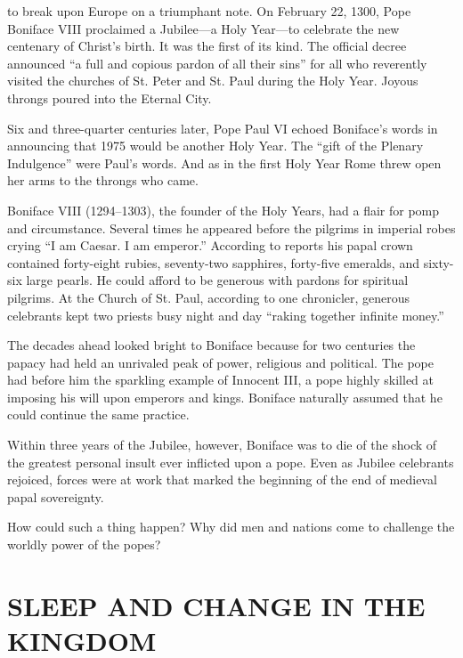 
 to break upon Europe on a triumphant note. On February
22, 1300, Pope Boniface VIII proclaimed a Jubilee—a Holy Year—to celebrate the new centenary of
Christ’s birth. It was the first of its kind. The official decree announced “a full and copious
pardon of all their sins” for all who reverently visited the churches of St. Peter and St. Paul
during the Holy Year. Joyous throngs poured into the Eternal City.

Six and three-quarter centuries later, Pope Paul VI echoed Boniface’s words in announcing that 1975
would be another Holy Year. The “gift of the Plenary Indulgence” were Paul’s words. And as in the
first Holy Year Rome threw open her arms to the throngs who came.

Boniface VIII (1294–1303), the founder of the Holy Years, had a flair for pomp and circumstance.
Several times he appeared before the pilgrims in imperial robes crying “I am Caesar. I am emperor.”
According to reports his papal crown contained forty-eight rubies, seventy-two sapphires, forty-five
emeralds, and sixty-six large pearls. He could afford to be generous with pardons for spiritual
pilgrims. At the Church of St. Paul, according to one chronicler, generous celebrants kept two
priests busy night and day “raking together infinite money.”

The decades ahead looked bright to Boniface because for two centuries the papacy had held an
unrivaled peak of power, religious and political. The pope had before him the sparkling example of
Innocent III, a pope highly skilled at imposing his will upon emperors and kings. Boniface naturally
assumed that he could continue the same practice.

Within three years of the Jubilee, however, Boniface was to die of the shock of the greatest
personal insult ever inflicted upon a pope. Even as Jubilee celebrants rejoiced, forces were at work
that marked the beginning of the end of medieval papal sovereignty.

How could such a thing happen? Why did men and nations come to challenge the worldly power of the
popes?

\section{SLEEP AND CHANGE IN THE KINGDOM}

